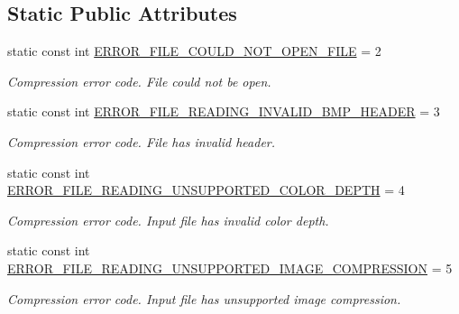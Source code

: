 \subsection*{Static Public Attributes}
\begin{DoxyCompactItemize}
\item 
static const int \hyperlink{classlossycompressor_1_1_compressor_a07fdf7be9f9fa5fd8b649f98addd2d4a}{E\+R\+R\+O\+R\+\_\+\+F\+I\+L\+E\+\_\+\+C\+O\+U\+L\+D\+\_\+\+N\+O\+T\+\_\+\+O\+P\+E\+N\+\_\+\+F\+I\+LE} = 2\hypertarget{classlossycompressor_1_1_compressor_a07fdf7be9f9fa5fd8b649f98addd2d4a}{}\label{classlossycompressor_1_1_compressor_a07fdf7be9f9fa5fd8b649f98addd2d4a}

\begin{DoxyCompactList}\small\item\em Compression error code. File could not be open. \end{DoxyCompactList}\item 
static const int \hyperlink{classlossycompressor_1_1_compressor_aa33c2e627c558ede20f8f25c79dd4462}{E\+R\+R\+O\+R\+\_\+\+F\+I\+L\+E\+\_\+\+R\+E\+A\+D\+I\+N\+G\+\_\+\+I\+N\+V\+A\+L\+I\+D\+\_\+\+B\+M\+P\+\_\+\+H\+E\+A\+D\+ER} = 3\hypertarget{classlossycompressor_1_1_compressor_aa33c2e627c558ede20f8f25c79dd4462}{}\label{classlossycompressor_1_1_compressor_aa33c2e627c558ede20f8f25c79dd4462}

\begin{DoxyCompactList}\small\item\em Compression error code. File has invalid header. \end{DoxyCompactList}\item 
static const int \hyperlink{classlossycompressor_1_1_compressor_aa5398d0324ee97ee5424039982d17e91}{E\+R\+R\+O\+R\+\_\+\+F\+I\+L\+E\+\_\+\+R\+E\+A\+D\+I\+N\+G\+\_\+\+U\+N\+S\+U\+P\+P\+O\+R\+T\+E\+D\+\_\+\+C\+O\+L\+O\+R\+\_\+\+D\+E\+P\+TH} = 4\hypertarget{classlossycompressor_1_1_compressor_aa5398d0324ee97ee5424039982d17e91}{}\label{classlossycompressor_1_1_compressor_aa5398d0324ee97ee5424039982d17e91}

\begin{DoxyCompactList}\small\item\em Compression error code. Input file has invalid color depth. \end{DoxyCompactList}\item 
static const int \hyperlink{classlossycompressor_1_1_compressor_a4b00953aaaa8adf72f975979b97f331a}{E\+R\+R\+O\+R\+\_\+\+F\+I\+L\+E\+\_\+\+R\+E\+A\+D\+I\+N\+G\+\_\+\+U\+N\+S\+U\+P\+P\+O\+R\+T\+E\+D\+\_\+\+I\+M\+A\+G\+E\+\_\+\+C\+O\+M\+P\+R\+E\+S\+S\+I\+ON} = 5\hypertarget{classlossycompressor_1_1_compressor_a4b00953aaaa8adf72f975979b97f331a}{}\label{classlossycompressor_1_1_compressor_a4b00953aaaa8adf72f975979b97f331a}

\begin{DoxyCompactList}\small\item\em Compression error code. Input file has unsupported image compression. \end{DoxyCompactList}\end{DoxyCompactItemize}


